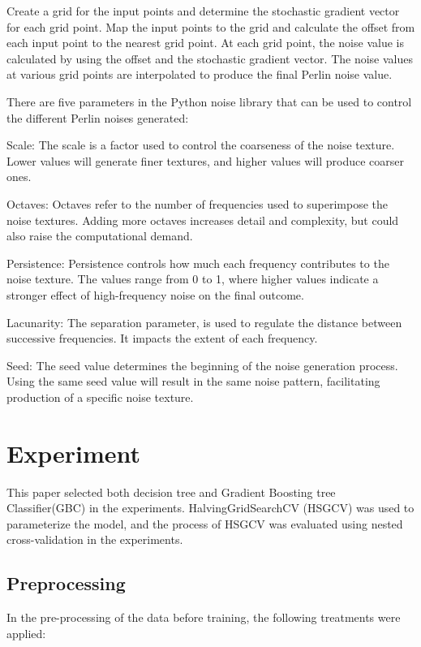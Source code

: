 \documentclass[runningheads,a4paper]{llncs}
\begin{document}
Create a grid for the input points and determine the stochastic gradient vector for each grid point.
Map the input points to the grid and calculate the offset from each input point to the nearest grid point.
At each grid point, the noise value is calculated by using the offset and the stochastic gradient vector.
The noise values at various grid points are interpolated to produce the final Perlin noise value.\cite{green2005implementing}

There are five parameters in the Python noise library that can be used to control the different Perlin noises generated:

Scale: The scale is a factor used to control the coarseness of the noise texture. Lower values will generate finer textures, and higher values will produce coarser ones.

Octaves: Octaves refer to the number of frequencies used to superimpose the noise textures. Adding more octaves increases detail and complexity, but could also raise the computational demand.

Persistence: Persistence controls how much each frequency contributes to the noise texture. The values range from 0 to 1, where higher values indicate a stronger effect of high-frequency noise on the final outcome.

Lacunarity: The separation parameter, is used to regulate the distance between successive frequencies. It impacts the extent of each frequency.

Seed: The seed value determines the beginning of the noise generation process. Using the same seed value will result in the same noise pattern, facilitating production of a specific noise texture.


\section{Experiment}

This paper selected both decision tree and Gradient Boosting tree Classifier(GBC) in the experiments. HalvingGridSearchCV (HSGCV)\cite{pmlr-v51-jamieson16} was used to parameterize the model, and the process of HSGCV was evaluated using nested cross-validation\cite{https://doi.org/10.1111/j.2517-6161.1974.tb00994.x} in the experiments.

\subsection{Preprocessing}
In the pre-processing of the data before training, the following treatments were applied:
\end{document}
